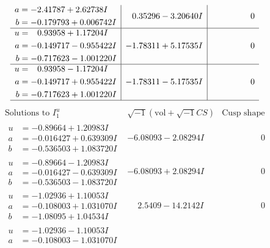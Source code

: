 \documentclass[1p]{elsarticle_modified}
\theoremstyle{definition}
\newcommand{\I}{\sqrt{-1}}
\begin{document}
$$\begin{array}{c|c|c}
\begin{aligned}
a &= -2.41787 + 2.62738 I \\
b &= -0.179793 + 0.006742 I\end{aligned}
 & \phantom{-}0.35296 - 3.20640 I & \phantom{-0.000000 } 0 \\ \hline\begin{aligned}
u &= \phantom{-}0.93958 + 1.17204 I \\
a &= -0.149717 - 0.955422 I \\
b &= -0.717623 - 1.001220 I\end{aligned}
 & -1.78311 + 5.17535 I & \phantom{-0.000000 } 0 \\ \hline\begin{aligned}
u &= \phantom{-}0.93958 - 1.17204 I \\
a &= -0.149717 + 0.955422 I \\
b &= -0.717623 + 1.001220 I\end{aligned}
 & -1.78311 - 5.17535 I & \phantom{-0.000000 } 0\\
 \hline 
 \end{array}$$\newpage$$\begin{array}{c|c|c}  
\text{Solutions to }I^u_{1}& \I (\text{vol} + \sqrt{-1}CS) & \text{Cusp shape}\\
 \hline 
\begin{aligned}
u &= -0.89664 + 1.20983 I \\
a &= -0.016427 + 0.639309 I \\
b &= -0.536503 + 1.083720 I\end{aligned}
 & -6.08093 - 2.08294 I & \phantom{-0.000000 } 0 \\ \hline\begin{aligned}
u &= -0.89664 - 1.20983 I \\
a &= -0.016427 - 0.639309 I \\
b &= -0.536503 - 1.083720 I\end{aligned}
 & -6.08093 + 2.08294 I & \phantom{-0.000000 } 0 \\ \hline\begin{aligned}
u &= -1.02936 + 1.10053 I \\
a &= -0.108003 + 1.031070 I \\
b &= -1.08095 + 1.04534 I\end{aligned}
 & \phantom{-}2.5409 - 14.2142 I & \phantom{-0.000000 } 0 \\ \hline\begin{aligned}
u &= -1.02936 - 1.10053 I \\
a &= -0.108003 - 1.031070 I \\

\end{aligned}
\end{array}$$
\end{document}
